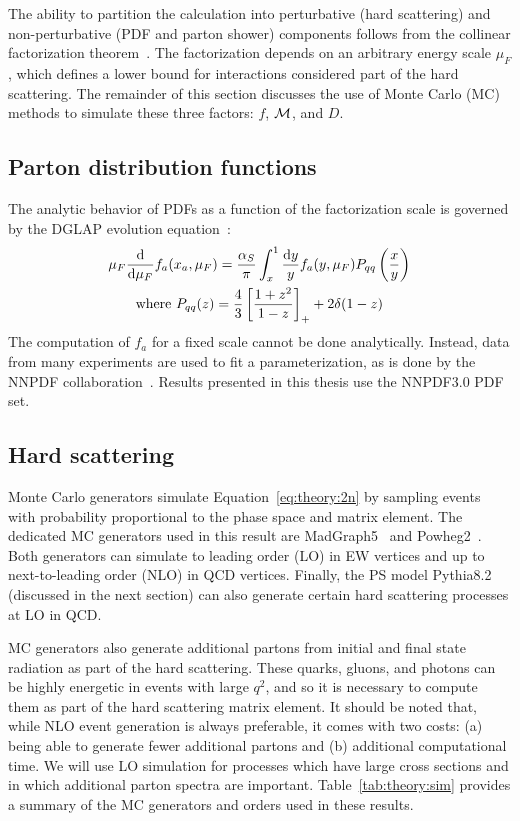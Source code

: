The ability to partition the calculation into perturbative (hard scattering) and non-perturbative (PDF and parton shower) components follows from the collinear factorization theorem~\cite{fact}.
The factorization depends on an arbitrary energy scale $\mu_F$, which defines a lower bound for interactions considered part of the hard scattering. 
The remainder of this section discusses the use of Monte Carlo (MC) methods to simulate these three factors: $f$, $\mathcal{M}$, and $D$.

\subsection{Parton distribution functions}
The analytic behavior of PDFs as a function of the factorization scale is governed by the DGLAP evolution equation~\cite{dglap1,dglap2,dglap3}:
\begin{gather}
    \mu_F \frac{\mathrm{d}}{\mathrm{d}\mu_F} f_a(x_a,\mu_F) = \frac{\alpha_S}{\pi} \int_x^1 \frac{\mathrm{d} y}{y} f_a(y,\mu_F) P_{qq} \left(\frac{x}{y}\right) \\
    \text{where } P_{qq}(z) = \frac{4}{3}\left[\frac{1+z^2}{1-z}\right]_+ + 2\delta(1-z) \nonumber 
    \label{eq:theory:dglap}
\end{gather}
The computation of $f_a$ for a fixed scale cannot be done analytically.
Instead, data from many experiments are used to fit a parameterization, as is done by the NNPDF collaboration~\cite{nnpdf}.
Results presented in this thesis use the NNPDF3.0 PDF set.

\subsection{Hard scattering}

Monte Carlo generators simulate Equation~\ref{eq:theory:2n} by sampling events with probability proportional to the phase space and matrix element.
The dedicated MC generators used in this result are MadGraph5~\cite{mg5,fxfx} and Powheg2~\cite{powheg}.
Both generators can simulate to leading order (LO) in EW vertices and up to next-to-leading order (NLO) in QCD vertices.
Finally, the PS model Pythia8.2~\cite{pythia} (discussed in the next section) can also generate certain hard scattering processes at LO in QCD.

MC generators also generate additional partons from initial and final state radiation as part of the hard scattering.
These quarks, gluons, and photons can be highly energetic in events with large $q^2$, and so it is necessary to compute them as part of the hard scattering matrix element.  
It should be noted that, while NLO event generation is always preferable, it comes with two costs: (a) being able to generate fewer additional partons and (b) additional computational time.
We will use LO simulation for processes which have large cross sections and in which additional parton spectra are important.
Table~\ref{tab:theory:sim} provides a summary of the MC generators and orders used in these results.

